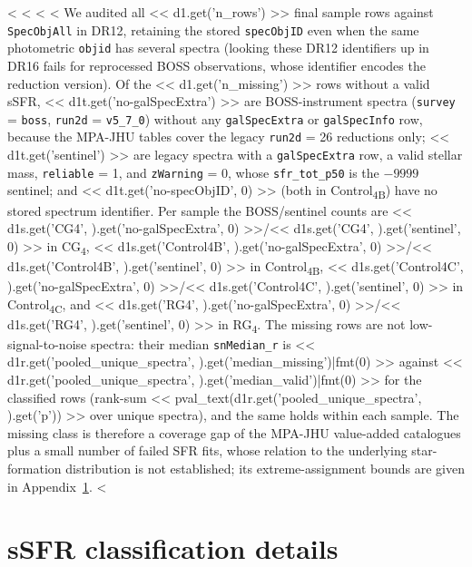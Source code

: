 \documentclass{aa}
\newcommand{\CB}{Control\textsubscript{4B}}
\newcommand{\CC}{Control\textsubscript{4C}}
\newcommand{\CG}{CG\textsubscript{4}}
\newcommand{\RG}{RG\textsubscript{4}}
\begin{document}
\begin{appendix}
<%
<%
<%
<%
We audited all << d1.get('n_rows') >> final sample rows against \texttt{SpecObjAll} in DR12, retaining the stored \texttt{specObjID} even when the same photometric \texttt{objid} has several spectra (looking these DR12 identifiers up in DR16 fails for reprocessed BOSS observations, whose identifier encodes the reduction version). Of the << d1.get('n_missing') >> rows without a valid sSFR, << d1t.get('no-galSpecExtra') >> are BOSS-instrument spectra (\texttt{survey} = \texttt{boss}, \texttt{run2d} = \texttt{v5\_7\_0}) without any \texttt{galSpecExtra} or \texttt{galSpecInfo} row, because the MPA-JHU tables cover the legacy \texttt{run2d} = 26 reductions only; << d1t.get('sentinel') >> are legacy spectra with a \texttt{galSpecExtra} row, a valid stellar mass, \texttt{reliable} = 1, and \texttt{zWarning} = 0, whose \texttt{sfr\_tot\_p50} is the \(-9999\) sentinel; and << d1t.get('no-specObjID', 0) >> (both in \CB{}) have no stored spectrum identifier. Per sample the BOSS/sentinel counts are << d1s.get('CG4', {}).get('no-galSpecExtra', 0) >>/<< d1s.get('CG4', {}).get('sentinel', 0) >> in \CG{}, << d1s.get('Control4B', {}).get('no-galSpecExtra', 0) >>/<< d1s.get('Control4B', {}).get('sentinel', 0) >> in \CB{}, << d1s.get('Control4C', {}).get('no-galSpecExtra', 0) >>/<< d1s.get('Control4C', {}).get('sentinel', 0) >> in \CC{}, and << d1s.get('RG4', {}).get('no-galSpecExtra', 0) >>/<< d1s.get('RG4', {}).get('sentinel', 0) >> in \RG{}. The missing rows are not low-signal-to-noise spectra: their median \texttt{snMedian\_r} is << d1r.get('pooled_unique_spectra', {}).get('median_missing')|fmt(0) >> against << d1r.get('pooled_unique_spectra', {}).get('median_valid')|fmt(0) >> for the classified rows (rank-sum << pval_text(d1r.get('pooled_unique_spectra', {}).get('p')) >> over unique spectra), and the same holds within each sample. The missing class is therefore a coverage gap of the MPA-JHU value-added catalogues plus a small number of failed SFR fits, whose relation to the underlying star-formation distribution is not established; its extreme-assignment bounds are given in Appendix~\ref{app:ssfr_method}.
<%

\section{sSFR classification details}\label{app:ssfr_method}


\end{appendix}
\end{document}
